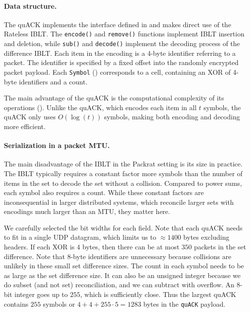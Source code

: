 \paragraph{Data structure.}

The quACK implements
the interface defined in  and makes direct use of the Rateless IBLT.
The \texttt{encode()} and \texttt{remove()} functions implement IBLT insertion
and deletion, while \texttt{sub()} and \texttt{decode()} implement
the decoding process of the difference IBLT.
Each item in the encoding is a 4-byte identifier referring to a packet. The
identifier is specified by a fixed offset into the randomly encrypted packet
payload. Each \texttt{Symbol} () corresponds to a
cell, containing an XOR of 4-byte identifiers and a count.

The main advantage of the quACK is the computational complexity of its
operations (). Unlike the quACK,
which encodes each item in all $t$ symbols, the quACK only uses
$O(\log(t))$ symbols, making both encoding and decoding more efficient.



\paragraph{Serialization in a packet MTU.} The main disadvantage of the IBLT in
 the Packrat setting is its size in practice. The IBLT typically requires a constant factor
 more symbols than the number of items in the set to decode the set without a
 collision. Compared to power sums, each symbol also requires a count. While
 these constant factors are inconsequential in larger distributed systems,
 which reconcile larger sets with encodings much larger than an MTU, they
 matter here.

We carefully selected the bit widths for each field. Note that each quACK needs
to fit in a single UDP datagram, which limits us to $\approx\!1400$ bytes
excluding headers. If each XOR is $4$ bytes, then there can be at most $350$
packets in the set difference. Note that $8$-byte identifiers are unnecessary
because collisions are unlikely in these small set difference sizes. The count
in each symbol needs to be as large as the set difference size. It can also be
an unsigned integer because we do subset (and not set) reconciliation, and we
can subtract with overflow. An 8-bit integer goes up to $255$, which is
sufficiently close. Thus the largest quACK contains $255$ symbols or $4 +
4 + 255 \cdot 5 = 1283$ bytes in the \texttt{quACK} payload.

